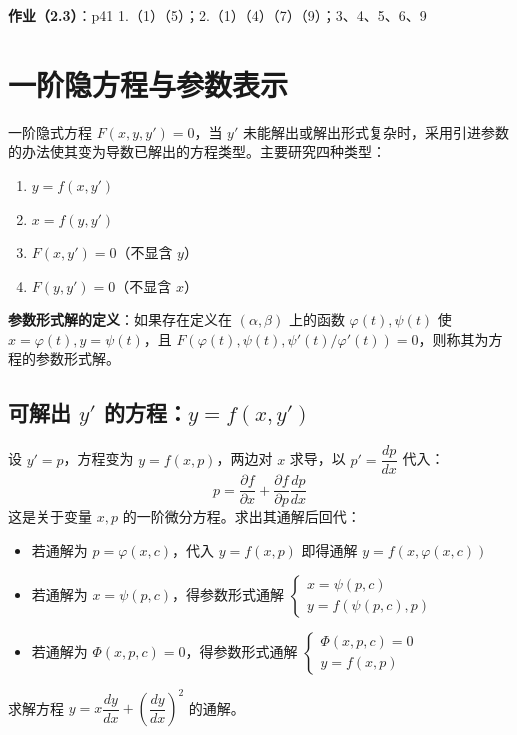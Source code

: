 \textbf{作业（2.3）}：p41 1.（1）（5）；2.（1）（4）（7）（9）；3、4、5、6、9

\section{一阶隐方程与参数表示}

一阶隐式方程 $F(x, y, y') = 0$，当 $y'$ 未能解出或解出形式复杂时，采用引进参数的办法使其变为导数已解出的方程类型。主要研究四种类型：
\begin{enumerate}
    \item $y = f(x, y')$
    \item $x = f(y, y')$
    \item $F(x, y') = 0$（不显含 $y$）
    \item $F(y, y') = 0$（不显含 $x$）
\end{enumerate}

\textbf{参数形式解的定义}：如果存在定义在 $(\alpha, \beta)$ 上的函数 $\varphi(t), \psi(t)$ 使 $x = \varphi(t), y = \psi(t)$，且 $F(\varphi(t), \psi(t), \psi'(t)/\varphi'(t)) = 0$，则称其为方程的参数形式解。

\subsection{可解出 $y'$ 的方程：$y = f(x, y')$}

\noindent 设 $y' = p$，方程变为 $y = f(x, p)$，两边对 $x$ 求导，以 $p' = \dfrac{dp}{dx}$ 代入：
$$p = \frac{\partial f}{\partial x} + \frac{\partial f}{\partial p}\frac{dp}{dx}$$
这是关于变量 $x, p$ 的一阶微分方程。求出其通解后回代：
\begin{itemize}
    \item 若通解为 $p = \varphi(x, c)$，代入 $y = f(x, p)$ 即得通解 $y = f(x, \varphi(x,c))$
    \item 若通解为 $x = \psi(p, c)$，得参数形式通解 $\begin{cases} x = \psi(p, c) \\ y = f(\psi(p,c), p) \end{cases}$
    \item 若通解为 $\Phi(x, p, c) = 0$，得参数形式通解 $\begin{cases} \Phi(x, p, c) = 0 \\ y = f(x, p) \end{cases}$
\end{itemize}

\begin{example}
求解方程 $y = x\dfrac{dy}{dx} + \left(\dfrac{dy}{dx}\right)^2$ 的通解。
\end{example}

